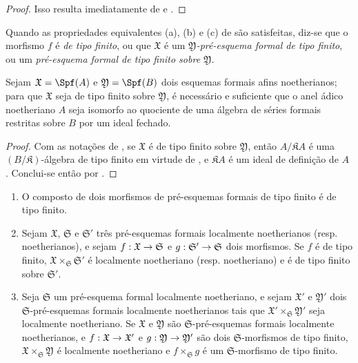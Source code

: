 \documentclass[oneside]{amsart}
\makeatletter
\newcommand{\ega@arrow}[2]{\mathchoice{#1}{#2}{#2}{#2}}
\renewcommand{\to}{\ega@arrow{\longrightarrow}{\rightarrow}}
\newcommand{\oldpage}[2][]{{\marginnote{\normalfont\textbf{#1}~|~#2}}\ignorespaces}
\let\EGAOriginalLabel\label
\renewcommand{\label}[1]{\phantomsection\EGAOriginalLabel{#1}}
\makeatother
\begin{document}
\begin{proof}
Isso resulta imediatamente de  e .
\end{proof}

\begin{definition}[10.13.3]
\label{I.10.13.3}
Quando as propriedades equivalentes (a), (b) e (c) de  são satisfeitas, diz-se que o morfismo $f$ é \emph{de tipo finito}, ou que $\mathfrak{X}$ é um \emph{$\mathfrak{Y}$-pré-esquema formal de tipo finito}, ou um \emph{pré-esquema formal de tipo finito sobre $\mathfrak{Y}$}.
\end{definition}

\begin{corollary}[10.13.4]
\label{I.10.13.4}
Sejam $\mathfrak{X}=\Spf(A)$ e $\mathfrak{Y}=\Spf(B)$ dois esquemas formais afins noetherianos;
para que $\mathfrak{X}$ seja de tipo finito sobre $\mathfrak{Y}$, é necessário e suficiente que o anel ádico noetheriano $A$ seja isomorfo ao quociente de uma álgebra de séries formais restritas sobre $B$ por um ideal fechado.
\end{corollary}

\begin{proof}
Com as notações de , se $\mathfrak{X}$ é de tipo finito sobre $\mathfrak{Y}$, então $A/\mathfrak{K}A$ é uma $(B/\mathfrak{K})$-álgebra de tipo finito em virtude de , e $\mathfrak{K}A$ é um ideal de definição de $A$ .
Conclui-se então por .
\end{proof}

\begin{proposition}[10.13.5]
\label{I.10.13.5}
\medskip\noindent
\begin{enumerate}
  \item[\rm{(i)}] O composto de dois morfismos de pré-esquemas formais de tipo finito é de tipo finito.
\oldpage[I]{209}
  \item[\rm{(ii)}] Sejam $\mathfrak{X}$, $\mathfrak{S}$ e $\mathfrak{S}'$ três pré-esquemas formais localmente noetherianos (resp. noetherianos), e sejam $f:\mathfrak{X}\to\mathfrak{S}$ e $g:\mathfrak{S}'\to\mathfrak{S}$ dois morfismos.
    Se $f$ é de tipo finito, $\mathfrak{X}\times_\mathfrak{S}\mathfrak{S}'$ é localmente noetheriano (resp. noetheriano) e é de tipo finito sobre $\mathfrak{S}'$.
  \item[\rm{(iii)}] Seja $\mathfrak{S}$ um pré-esquema formal localmente noetheriano, e sejam $\mathfrak{X}'$ e $\mathfrak{Y}'$ dois $\mathfrak{S}$-pré-esquemas formais localmente noetherianos tais que $\mathfrak{X}'\times_\mathfrak{S}\mathfrak{Y}'$ seja localmente noetheriano.
    Se $\mathfrak{X}$ e $\mathfrak{Y}$ são $\mathfrak{S}$-pré-esquemas formais localmente noetherianos, e $f:\mathfrak{X}\to\mathfrak{X}'$ e $g:\mathfrak{Y}\to\mathfrak{Y}'$ são dois $\mathfrak{S}$-morfismos de tipo finito, $\mathfrak{X}\times_\mathfrak{S}\mathfrak{Y}$ é localmente noetheriano e $f\times_\mathfrak{S}g$ é um $\mathfrak{S}$-morfismo de tipo finito.
\end{enumerate}
\end{proposition}
\end{document}
